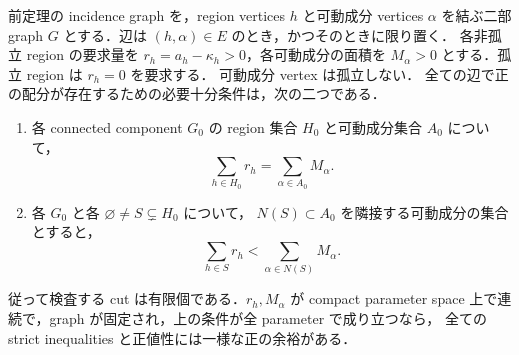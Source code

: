 \begin{proposition}
\label{ng8:strict-area-cuts}
前定理の incidence graph を，region vertices $h$ と可動成分 vertices $\alpha$
を結ぶ二部 graph $G$ とする．辺は $(h,\alpha)\in E$ のとき，かつそのときに限り置く．
各非孤立 region の要求量を $r_h=a_h-\kappa_h>0$，各可動成分の面積を
$M_\alpha>0$ とする．孤立 region は $r_h=0$ を要求する．
可動成分 vertex は孤立しない．
全ての辺で正の配分が存在するための必要十分条件は，次の二つである．
\begin{enumerate}
\item 各 connected component $G_0$ の region 集合 $H_0$ と可動成分集合
  $A_0$ について，
  \[
    \sum_{h\in H_0}r_h=\sum_{\alpha\in A_0}M_\alpha .
  \]
\item 各 $G_0$ と各 $\varnothing\ne S\subsetneq H_0$ について，
  $N(S)\subset A_0$ を隣接する可動成分の集合とすると，
  \begin{equation}\label{ng8:eq:strict-area-cut}
    \sum_{h\in S}r_h<
    \sum_{\alpha\in N(S)}M_\alpha .
  \end{equation}
\end{enumerate}
従って検査する cut は有限個である．$r_h,M_\alpha$ が compact parameter
space 上で連続で，graph が固定され，上の条件が全 parameter で成り立つなら，
全ての strict inequalities と正値性には一様な正の余裕がある．
\end{proposition}

